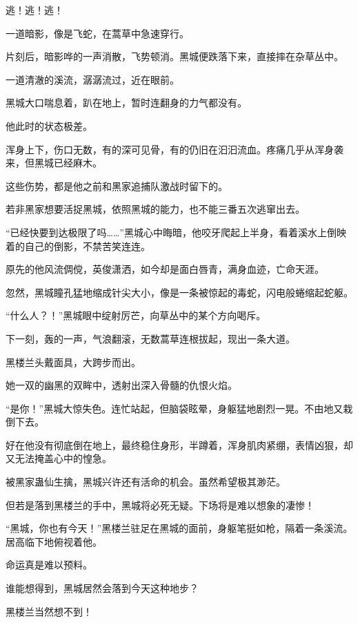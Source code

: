 
\begin{this_body}

逃！逃！逃！

一道暗影，像是飞蛇，在蒿草中急速穿行。

片刻后，暗影哗的一声消散，飞势顿消。黑城便跌落下来，直接摔在杂草丛中。

一道清澈的溪流，潺潺流过，近在眼前。

黑城大口喘息着，趴在地上，暂时连翻身的力气都没有。

他此时的状态极差。

浑身上下，伤口无数，有的深可见骨，有的仍旧在汩汩流血。疼痛几乎从浑身袭来，但黑城已经麻木。

这些伤势，都是他之前和黑家追捕队激战时留下的。

若非黑家想要活捉黑城，依照黑城的能力，也不能三番五次逃窜出去。

“已经快要到达极限了吗……”黑城心中晦暗，他咬牙爬起上半身，看着溪水上倒映着的自己的倒影，不禁苦笑连连。

原先的他风流倜傥，英俊潇洒，如今却是面白唇青，满身血迹，亡命天涯。

忽然，黑城瞳孔猛地缩成针尖大小，像是一条被惊起的毒蛇，闪电般蜷缩起蛇躯。

“什么人？！”黑城眼中绽射厉芒，向草丛中的某个方向喝斥。

下一刻，轰的一声，气浪翻滚，无数蒿草连根拔起，现出一条大道。

黑楼兰头戴面具，大跨步而出。

她一双的幽黑的双眸中，透射出深入骨髓的仇恨火焰。

“是你！”黑城大惊失色。连忙站起，但脑袋眩晕，身躯猛地剧烈一晃。不由地又栽倒下去。

好在他没有彻底倒在地上，最终稳住身形，半蹲着，浑身肌肉紧绷，表情凶狠，却又无法掩盖心中的惶急。

被黑家蛊仙生擒，黑城兴许还有活命的机会。虽然希望极其渺茫。

但若是落到黑楼兰的手中，黑城将必死无疑。下场将是难以想象的凄惨！

“黑城，你也有今天！”黑楼兰驻足在黑城的面前，身躯笔挺如枪，隔着一条溪流。居高临下地俯视着他。

命运真是难以预料。

谁能想得到，黑城居然会落到今天这种地步？

黑楼兰当然想不到！


\end{this_body}
